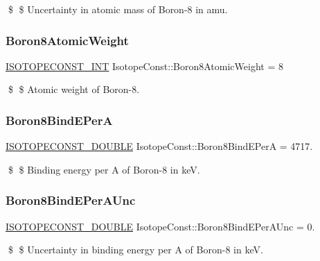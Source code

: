 \$ \$ Uncertainty in atomic mass of Boron-\/8 in amu. \mbox{\label{group___isotope_const-_boron-_b8_ga6c3f5d2684749ad7ec4403beaeefdffa}} 
\subsubsection{\texorpdfstring{Boron8\+Atomic\+Weight}{Boron8AtomicWeight}}
{\footnotesize\ttfamily \mbox{\hyperlink{group___isotope_const-_macros_ga5f18360b3e99483a35c32d789e62621c}{I\+S\+O\+T\+O\+P\+E\+C\+O\+N\+S\+T\+\_\+\+I\+NT}} Isotope\+Const\+::\+Boron8\+Atomic\+Weight = 8}

\$ \$ Atomic weight of Boron-\/8. \mbox{\label{group___isotope_const-_boron-_b8_ga076c9ec8b6e9ed2a0d0ae2820f7f58ce}} 
\subsubsection{\texorpdfstring{Boron8\+Bind\+E\+PerA}{Boron8BindEPerA}}
{\footnotesize\ttfamily \mbox{\hyperlink{group___isotope_const-_macros_ga8f45a7272ce02c0b4c65c44636ed719a}{I\+S\+O\+T\+O\+P\+E\+C\+O\+N\+S\+T\+\_\+\+D\+O\+U\+B\+LE}} Isotope\+Const\+::\+Boron8\+Bind\+E\+PerA = 4717.}

\$ \$ Binding energy per A of Boron-\/8 in keV. \mbox{\label{group___isotope_const-_boron-_b8_ga8cdbcf2bfb7fe3a01a29d8c16c6ada00}} 
\subsubsection{\texorpdfstring{Boron8\+Bind\+E\+Per\+A\+Unc}{Boron8BindEPerAUnc}}
{\footnotesize\ttfamily \mbox{\hyperlink{group___isotope_const-_macros_ga8f45a7272ce02c0b4c65c44636ed719a}{I\+S\+O\+T\+O\+P\+E\+C\+O\+N\+S\+T\+\_\+\+D\+O\+U\+B\+LE}} Isotope\+Const\+::\+Boron8\+Bind\+E\+Per\+A\+Unc = 0.}

\$ \$ Uncertainty in binding energy per A of Boron-\/8 in keV. \mbox{\label{group___isotope_const-_boron-_b8_ga4d21c586a7a001b980746838a40ec773}} 

